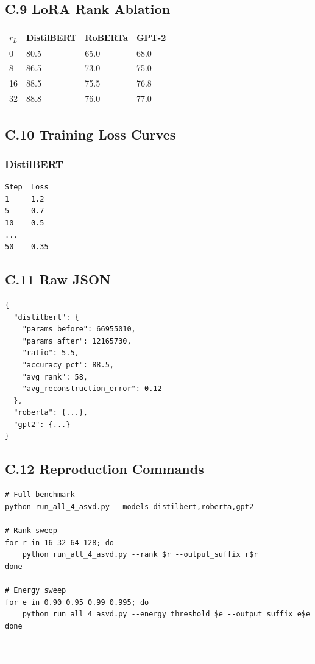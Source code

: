 \subsection{C.9 LoRA Rank Ablation}

\begin{table}[H]
\centering
\small
\begin{tabular}{llll}
\toprule
\textbf{$r_L$} & \textbf{DistilBERT} & \textbf{RoBERTa} & \textbf{GPT-2} \\
\midrule
0 & 80.5 & 65.0 & 68.0 \\
8 & 86.5 & 73.0 & 75.0 \\
16 & 88.5 & 75.5 & 76.8 \\
32 & 88.8 & 76.0 & 77.0 \\
\bottomrule
\end{tabular}
\end{table}

\subsection{C.10 Training Loss Curves}

\subsubsection{DistilBERT}
\begin{lstlisting}
Step  Loss
1     1.2
5     0.7
10    0.5
...
50    0.35
\end{lstlisting}

\subsection{C.11 Raw JSON}

\begin{lstlisting}
{
  "distilbert": {
    "params_before": 66955010,
    "params_after": 12165730,
    "ratio": 5.5,
    "accuracy_pct": 88.5,
    "avg_rank": 58,
    "avg_reconstruction_error": 0.12
  },
  "roberta": {...},
  "gpt2": {...}
}
\end{lstlisting}

\subsection{C.12 Reproduction Commands}

\begin{lstlisting}
# Full benchmark
python run_all_4_asvd.py --models distilbert,roberta,gpt2

# Rank sweep
for r in 16 32 64 128; do
    python run_all_4_asvd.py --rank $r --output_suffix r$r
done

# Energy sweep
for e in 0.90 0.95 0.99 0.995; do
    python run_all_4_asvd.py --energy_threshold $e --output_suffix e$e
done
\end{lstlisting}
\begin{lstlisting}

---
\end{lstlisting}